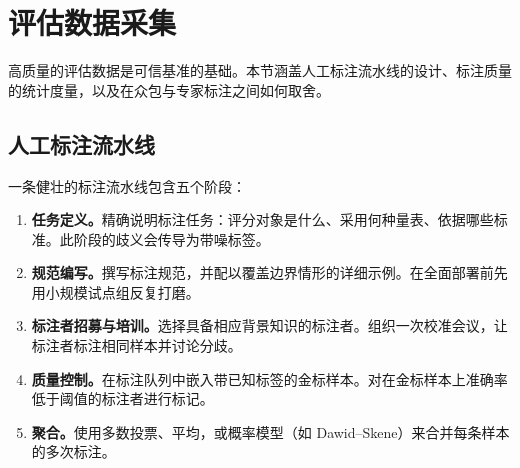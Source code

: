 \section{评估数据采集}
\label{subsec:data-collection}

高质量的评估数据是可信基准的基础。本节涵盖人工标注流水线的设计、标注质量的统计度量，以及在众包与专家标注之间如何取舍。

\subsection{人工标注流水线}
\label{human-annotation-pipelines}

一条健壮的标注流水线包含五个阶段：

\begin{enumerate}
  \item \textbf{任务定义。}精确说明标注任务：评分对象是什么、采用何种量表、依据哪些标准。此阶段的歧义会传导为带噪标签。
  \item \textbf{规范编写。}撰写标注规范，并配以覆盖边界情形的详细示例。在全面部署前先用小规模试点组反复打磨。
  \item \textbf{标注者招募与培训。}选择具备相应背景知识的标注者。组织一次校准会议，让标注者标注相同样本并讨论分歧。
  \item \textbf{质量控制。}在标注队列中嵌入带已知标签的金标样本。对在金标样本上准确率低于阈值的标注者进行标记。
  \item \textbf{聚合。}使用多数投票、平均，或概率模型（如 Dawid--Skene）来合并每条样本的多次标注。
\end{enumerate}

